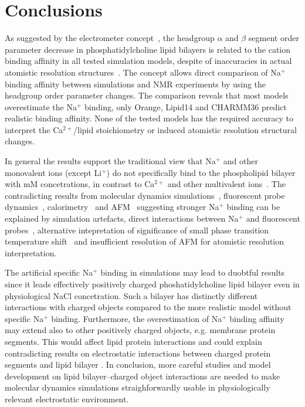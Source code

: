 \documentclass[pre,aps,floatfix,authordate1-4,twocolumn]{revtex4-1}
\begin{document}
\section{Conclusions}
As suggested by the electrometer concept~\cite{akutsu81,altenbach84,seelig87,scherer89},
the headgroup $\alpha$ and $\beta$ segment order parameter decrease in phosphatidylcholine lipid bilayers 
is related to the cation binding affinity in all tested simulation models, despite of inaccuracies 
in actual atomistic resolution structures~\cite{botan15}. The concept allows direct comparison
of Na$^+$ binding affinity between simulations and NMR experiments by using the headgroup order parameter changes.
The comparison reveals that most models overestimate the Na$^+$ binding, only Orange, Lipid14 and CHARMM36 
predict realistic binding affinity. None of the tested models has the required accuracy to interpret
the Ca$^{2+}$/lipid stoichiometry or induced atomistic resolution structural changes.

In general the results support the traditional view that Na$^+$ and other monovalent ions (except Li$^+$)
do not specifically bind to the phospholipid bilayer with mM concetrations, in contrast to Ca$^{2+}$ and other multivalent 
ions~\cite{eisenberg79,akutsu81,altenbach84,tatulian87,clarke99,binder02,pabst07,filippov09}.
The contradicting results from molecular dynamics simulations~\cite{bockmann03,bockmann04}, fluorescent probe dynamics~\cite{bockmann03,vacha09a,harb13}, 
calorimetry~\cite{bockmann03,klasczyk10} and AFM~\cite{manyes05,manyes06,fukuma07,ferber11,morata12} suggesting stronger Na$^+$ binding can be explained by simulation artefacts, 
direct interactions between Na$^+$ and fluorescent probes~\cite{filippov09}, alternative intepretation of significance
of small phase transition temperature shift~\cite{cevc90} and insufficient resolution of AFM for atomistic resolution interpretation.

The artificial specific Na$^+$ binding in simulations may lead to duobtful results since it leads effectively 
positively charged phoshatidylcholine lipid bilayer even in physiological NaCl concetration.
Such a bilayer has distinctly different interactions with charged objects compared to the more realistic
model without specific Na$^+$ binding. Furthermore, the overestimation of Na$^+$ binding affinity may
extend also to other positively charged objects, e.g. membrane protein segments. This would affect
lipid protein interactions and could explain contradicting results on electrostatic interactions 
between charged protein segments and lipid bilayer \cite{arkhipov13,kaszuba15}. In conclusion, 
more careful studies and model development on lipid bilayer--charged object interactions are
needed to make molecular dynamics simulations straighforwardly usable in physiologically relevant
electrostatic environment. 
\end{document}

